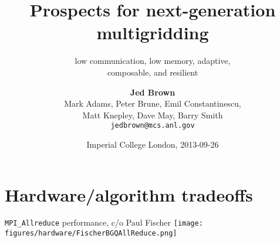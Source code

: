 \documentclass{beamer}
\title{Prospects for next-generation multigridding}
\subtitle{low communication, low memory, adaptive, \\ composable, and resilient}
\author{{\bf Jed Brown} \\
Mark Adams, Peter Brune, Emil Constantinescu, \\
Matt Knepley, Dave May, Barry Smith \\
\texttt{jedbrown@mcs.anl.gov}
}
\institute
{
  Mathematics and Computer Science Division \\ Argonne National Laboratory
}
\date{Imperial College London, 2013-09-26}
\begin{document}
\lstset{language=C}
\normalem

\begin{frame}
  \titlepage
\end{frame}

\section{Hardware/algorithm tradeoffs}




\begin{frame}{\texttt{MPI\_Allreduce} performance, c/o Paul Fischer}
  \texttt{[image: figures/hardware/FischerBGQAllReduce.png]}
\end{frame}
\end{document}
